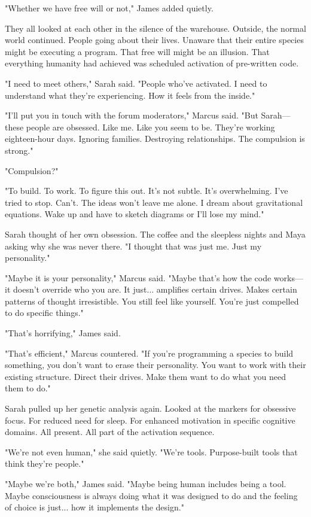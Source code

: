 "Whether we have free will or not," James added quietly.

They all looked at each other in the silence of the warehouse. Outside, the normal world continued. People going about their lives. Unaware that their entire species might be executing a program. That free will might be an illusion. That everything humanity had achieved was scheduled activation of pre-written code.

"I need to meet others," Sarah said. "People who've activated. I need to understand what they're experiencing. How it feels from the inside."

"I'll put you in touch with the forum moderators," Marcus said. "But Sarah—these people are obsessed. Like me. Like you seem to be. They're working eighteen-hour days. Ignoring families. Destroying relationships. The compulsion is strong."

"Compulsion?"

"To build. To work. To figure this out. It's not subtle. It's overwhelming. I've tried to stop. Can't. The ideas won't leave me alone. I dream about gravitational equations. Wake up and have to sketch diagrams or I'll lose my mind."

Sarah thought of her own obsession. The coffee and the sleepless nights and Maya asking why she was never there. "I thought that was just me. Just my personality."

"Maybe it is your personality," Marcus said. "Maybe that's how the code works—it doesn't override who you are. It just... amplifies certain drives. Makes certain patterns of thought irresistible. You still feel like yourself. You're just compelled to do specific things."

"That's horrifying," James said.

"That's efficient," Marcus countered. "If you're programming a species to build something, you don't want to erase their personality. You want to work with their existing structure. Direct their drives. Make them want to do what you need them to do."

Sarah pulled up her genetic analysis again. Looked at the markers for obsessive focus. For reduced need for sleep. For enhanced motivation in specific cognitive domains. All present. All part of the activation sequence.

"We're not even human," she said quietly. "We're tools. Purpose-built tools that think they're people."

"Maybe we're both," James said. "Maybe being human includes being a tool. Maybe consciousness is always doing what it was designed to do and the feeling of choice is just... how it implements the design."

